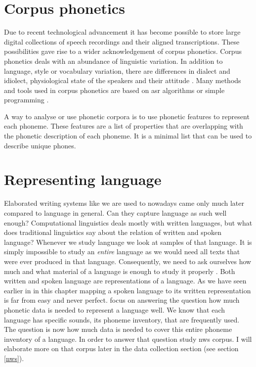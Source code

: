 
\section{Corpus phonetics}
Due to recent technological advancement it has become possible to store large digital collections of speech recordings and their aligned transcriptions. These possibilities gave rise to a wider acknowledgement of corpus phonetics. Corpus phonetics deals with an abundance of linguistic variation. In addition to language, style or vocabulary variation, there are differences in dialect and idiolect, physiological state of the speakers and their attitude \citep{Liberman.2019, Chodroff.19.07.2019}. Many methods and tools used in corpus phonetics are based on \ac{asr} algorithms or simple programming \citep{Chodroff.19.07.2019}.

A way to analyse or use phonetic corpora is to use phonetic features to represent each phoneme. These features are a list of properties that are overlapping with the phonetic description of each phoneme. It is a minimal list that can be used to describe unique phones. 

\section{Representing language}

Elaborated writing systems like we are used to nowadays came only much later compared to language in general. Can they capture language as such well enough? Computational linguistics deals mostly with written languages, but what does traditional linguistics say about the relation of written and spoken language? Whenever we study language we look at samples of that language. It is simply impossible to study an \textit{entire} language as we would need all texts that were ever produced in that language. Consequently, we need to ask ourselves how much and what material of a language is enough to study it properly \citep{baird_evans_greenhill_2021}. Both written and spoken language are representations of a language. As we have seen earlier in in this chapter mapping a spoken language to its written representation is far from easy and never perfect. \citet{baird_evans_greenhill_2021} focus on answering the question how much phonetic data is needed to represent a language well. We know that each language has specific sounds, its phoneme inventory, that are frequently used. The question is now how much data is needed to cover this entire phoneme inventory of a language. In order to answer that question \citet{baird_evans_greenhill_2021} study \ac{nws} corpus. I will elaborate more on that corpus later in the data collection section (see section \ref{nws}).


